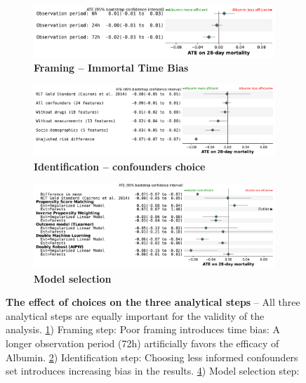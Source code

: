 \documentclass[10pt,letterpaper]{article}
\begin{document}
\begin{figure}[h!]
  \begin{subfigure}[b]{\linewidth}
    \caption{\bfseries Framing -- Immortal Time Bias}\label{fig:vibration:itb}
    \includegraphics[width=0.765\linewidth, right]{img/itb__dr_forest_agg_first_last__bs_30_shared_x_axis.pdf}
  \end{subfigure}
  \vfill
  \begin{subfigure}[b]{\linewidth}
    \centering
    \caption{\bfseries Identification -- confounders choice}\label{fig:vibration:confounders}
    \includegraphics[width=.9\linewidth, right]{img/sensitivity_confounders_main_shared_x_axis.pdf}
  \end{subfigure}
  \vfill
  \begin{subfigure}[b]{\linewidth}
    \centering
    \caption{\bfseries Model selection}\label{fig:vibration:models}
    \includegraphics[width=0.891\linewidth, right]{img/estimates_20230712__est_lr_rf__bs_50_shared_x_axis.pdf}
  \end{subfigure}
  \vfill
  \caption{\textbf{The effect of choices on the three
      analytical steps} -- All three
    analytical steps are equally important for the validity of the analysis.
    \ref{fig:vibration:itb}) Framing step: Poor framing introduces time bias: A longer
    observation period (72h) artificially favors the efficacy of Albumin.
    \ref{fig:vibration:confounders}) Identification step: Choosing less informed confounders set
    introduces increasing bias in the results. \ref{fig:vibration:models}) Model selection step:
}
\end{figure}
\end{document}
